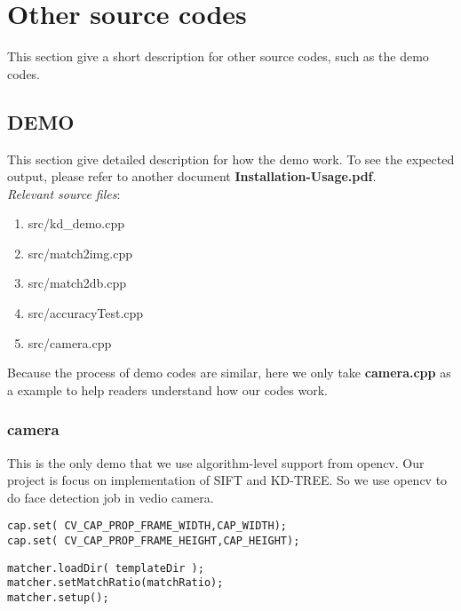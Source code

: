 \documentclass[paper=a4, fontsize=11pt]{scrartcl} %
\newcounter{subsubsubsection}[subsubsection]
\numberwithin{equation}{section} %
\numberwithin{figure}{section} %
\numberwithin{table}{section} %
\begin{document}
\clearpage

\section{Other source codes}

This section give a short description for other source codes, such as the demo codes.

\subsection{DEMO}  \label{sec-demo}

This section give detailed description for how the demo work. To see the expected output, please refer to another document \textbf{Installation-Usage.pdf}. \\


\textsl{Relevant source files}: 

\begin{enumerate}
    \item src/kd\_demo.cpp
    \item src/match2img.cpp
    \item src/match2db.cpp
    \item src/accuracyTest.cpp
    \item src/camera.cpp
\end{enumerate}

Because the process of demo codes are similar, here we only take \textbf{camera.cpp} as a example to help readers understand how our codes work.

\subsubsection{camera}

This is the only demo that we use algorithm-level support from opencv. Our project is focus on implementation of SIFT and KD-TREE. So we use opencv to do face detection job in vedio camera.


\begin{lstlisting}
cap.set( CV_CAP_PROP_FRAME_WIDTH,CAP_WIDTH);
cap.set( CV_CAP_PROP_FRAME_HEIGHT,CAP_HEIGHT);
\end{lstlisting}


\begin{lstlisting}
matcher.loadDir( templateDir );
matcher.setMatchRatio(matchRatio);
matcher.setup();
\end{lstlisting}
\end{document}
